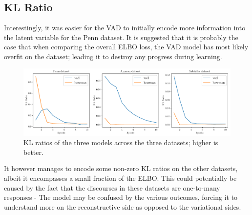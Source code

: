 \documentclass[12pt,twoside]{report}
\begin{document}

	


\subsection{KL Ratio}

Interestingly, it was easier for the VAD to initially encode more information into the latent variable for the Penn dataset. It is suggested that it is probably the case that when comparing the overall ELBO loss, the VAD model has most likely overfit on the dataset; leading it to destroy any progress during learning.

\begin{figure}[!ht]
	\centering
	\includegraphics[width=150mm]{results/kl_ratio.pdf}
	\caption{KL ratios of the three models across the three datasets; higher is better.\label{r:kl_ratio}}
	\end{figure}

It however manages to encode some non-zero KL ratios on the other datasets, albeit it encompasses a small fraction of the ELBO. This could potentially be caused by the fact that the discourses in these datasets are one-to-many responses - The model may be confused by the various outcomes, forcing it to understand more on the reconstructive side as opposed to the variational sides.
\end{document}
